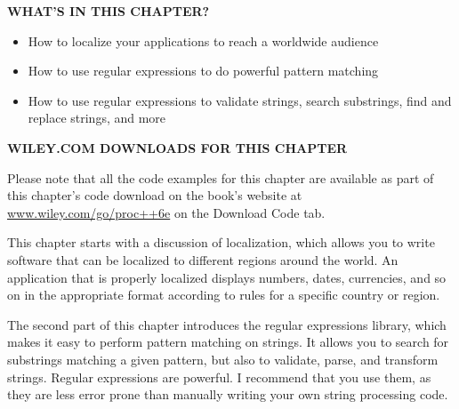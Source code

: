 \noindent
\textbf{WHAT’S IN THIS CHAPTER?}

\begin{itemize}
\item
How to localize your applications to reach a worldwide audience

\item
How to use regular expressions to do powerful pattern matching

\item
How to use regular expressions to validate strings, search substrings, find and replace strings, and more
\end{itemize}

\noindent
\textbf{WILEY.COM DOWNLOADS FOR THIS CHAPTER}

Please note that all the code examples for this chapter are available as part of this chapter’s code download on the book’s website at \url{www.wiley.com/go/proc++6e} on the Download Code tab.

This chapter starts with a discussion of localization, which allows you to write software that can be localized to different regions around the world. An application that is properly localized displays numbers, dates, currencies, and so on in the appropriate format according to rules for a specific country or region.

The second part of this chapter introduces the regular expressions library, which makes it easy to perform pattern matching on strings. It allows you to search for substrings matching a given pattern, but also to validate, parse, and transform strings. Regular expressions are powerful. I recommend that you use them, as they are less error prone than manually writing your own string processing code.